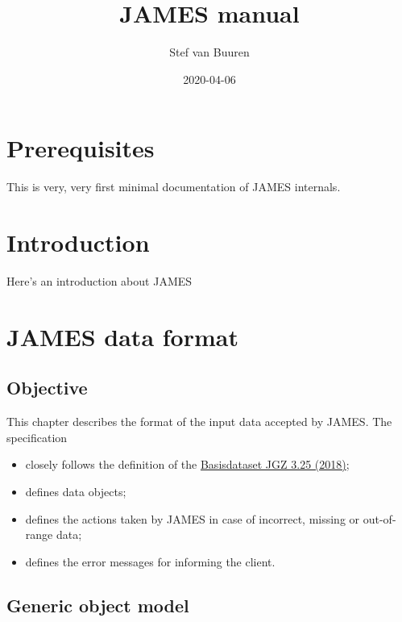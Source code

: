 \documentclass[]{book}
\title{JAMES manual}
\author{Stef van Buuren}
\date{2020-04-06}
\providecommand{\tightlist}{%
  \setlength{\itemsep}{0pt}\setlength{\parskip}{0pt}}
\begin{document}
\maketitle

{
\setcounter{tocdepth}{1}
\tableofcontents
}
\hypertarget{prerequisites}{%
\chapter{Prerequisites}\label{prerequisites}}

This is very, very first minimal documentation of JAMES internals.

\hypertarget{intro}{%
\chapter{Introduction}\label{intro}}

Here's an introduction about JAMES

\hypertarget{james-data-format}{%
\chapter{JAMES data format}\label{james-data-format}}

\hypertarget{objective}{%
\section{Objective}\label{objective}}

This chapter describes the format of the input data accepted by JAMES. The specification

\begin{itemize}
\tightlist
\item
  closely follows the definition of the \href{https://www.ncj.nl/themadossiers/informatisering/basisdataset/}{Basisdataset JGZ 3.25 (2018)};
\item
  defines data objects;
\item
  defines the actions taken by JAMES in case of incorrect, missing or out-of-range data;
\item
  defines the error messages for informing the client.
\end{itemize}

\hypertarget{generic-object-model}{%
\section{Generic object model}\label{generic-object-model}}
\end{document}
